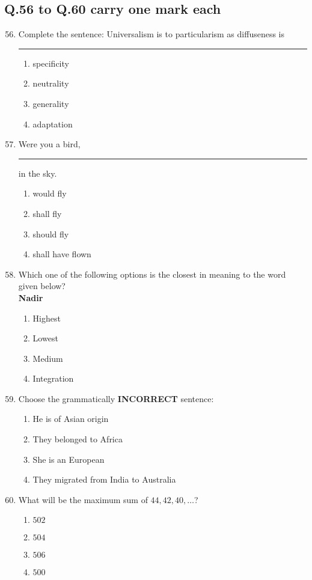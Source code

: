 \documentclass[journal,12pt,onecolumn]{IEEEtran}
\theoremstyle{remark}
\begin{document}
\subsection{\textbf{Q.56 to Q.60 carry one mark each}}
\begin{enumerate}\setcounter{enumi}{55}
    \item Complete the sentence:
Universalism is to particularism as diffuseness is \rule{1cm}{0.15mm}
\begin{multicols}{4}
    \begin{enumerate}
        \item specificity
        \item neutrality
        \item generality
        \item adaptation
    \end{enumerate}
\end{multicols}
\item Were you a bird, \rule{1cm}{0.15mm} in the sky.
\begin{multicols}{4}
    \begin{enumerate}
        \item would fly
        \item shall fly
        \item should fly
        \item shall have flown
    \end{enumerate}
\end{multicols}
\item Which one of the following options is the closest in meaning to the word given below?\\
	\textbf{Nadir}
\begin{multicols}{4}
    \begin{enumerate}
        \item Highest
        \item Lowest
        \item Medium
        \item Integration
    \end{enumerate}
\end{multicols}
\item Choose the grammatically \textbf{INCORRECT} sentence:
\begin{enumerate}
    \item He is of Asian origin
    \item They belonged to Africa
    \item She is an European
    \item They migrated from India to Australia
\end{enumerate}
\item What will be the maximum sum of $44, 42, 40, \dots $?
\begin{multicols}{4}
    \begin{enumerate}
        \item $502$
        \item $504$
        \item $506$
        \item $500$
    \end{enumerate}
\end{multicols}
\end{enumerate}
\end{document}
